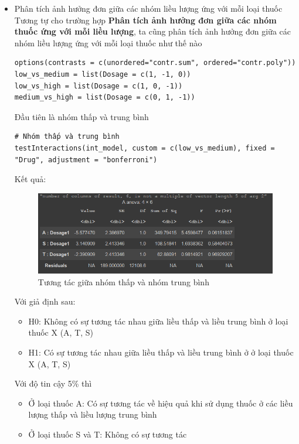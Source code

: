 \begin{itemize}
    \item Phân tích ảnh hưởng đơn giữa các nhóm liều lượng ứng với mỗi loại thuốc
    Tương tự cho trường hợp \textbf{Phân tích ảnh hưởng đơn giữa các nhóm thuốc ứng với mỗi liều lượng}, ta cũng phân tích ảnh hưởng đơn giữa các nhóm liều lượng ứng với mỗi loại thuốc như thế nào
    \begin{lstlisting}
options(contrasts = c(unordered="contr.sum", ordered="contr.poly"))
low_vs_medium = list(Dosage = c(1, -1, 0))
low_vs_high = list(Dosage = c(1, 0, -1))
medium_vs_high = list(Dosage = c(0, 1, -1))
    \end{lstlisting}
    Đầu tiên là nhóm thấp và trung bình
    \begin{lstlisting}
# Nhóm thấp và trung bình
testInteractions(int_model, custom = c(low_vs_medium), fixed = "Drug", adjustment = "bonferroni")
    \end{lstlisting}
    Kết quả:
    \begin{figure}[H]
        \centering
        \includegraphics[width=0.8\linewidth]{part01_figures/13.png}
        \caption{Tương tác giữa nhóm thấp và nhóm trung bình}
        \label{fig:Tương tác giữa nhóm thấp và nhóm trung bình}
    \end{figure}
    Với giả định sau:
        \begin{itemize}
            \item H0: Không có sự tương tác nhau giữa liều thấp và liều trung bình ở loại thuốc X (A, T, S)
            \item H1: Có sự tương tác nhau giữa liều thấp và liều trung bình ở  ở loại thuốc X (A, T, S)
        \end{itemize}
    Với độ tin cậy 5\% thì
    \begin{itemize}
        \item Ở loại thuốc A: Có sự tương tác về hiệu quả khi sử dụng thuốc ở các  liều lượng thấp và liều lượng trung bình
        \item Ở loại thuốc S và T: Không có sự tương tác
    \end{itemize}


\end{itemize}
